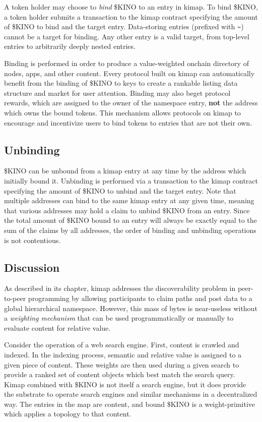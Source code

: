 \documentclass[runningheads]{llncs}
\begin{document}
A token holder may choose to \textit{bind} \$KINO to an entry in kimap.
To bind \$KINO, a token holder submits a transaction to the kimap contract specifying the amount of \$KINO to bind and the target entry.
Data-storing entries (prefixed with \verb|~|) cannot be a target for binding.
Any other entry is a valid target, from top-level entries to arbitrarily deeply nested entries.

Binding is performed in order to produce a value-weighted onchain directory of nodes, apps, and other content.
Every protocol built on kimap can automatically benefit from the binding of \$KINO to keys to create a rankable listing data structure and market for user attention.
Binding may also beget protocol rewards, which are assigned to the owner of the namespace entry, \textbf{not} the address which owns the bound tokens.
This mechanism allows protocols on kimap to encourage and incentivize users to bind tokens to entries that are not their own.

\subsection{Unbinding}

\$KINO can be unbound from a kimap entry at any time by the address which initially bound it.
Unbinding is performed via a transaction to the kimap contract specifying the amount of \$KINO to unbind and the target entry.
Note that multiple addresses can bind to the same kimap entry at any given time, meaning that various addresses may hold a claim to unbind \$KINO from an entry. Since the total amount of \$KINO bound to an entry will always be exactly equal to the sum of the claims by all addresses, the order of binding and unbinding operations is not contentious.

\subsection{Discussion}

As described in its chapter, kimap addresses the discoverability problem in peer-to-peer programming by allowing participants to claim paths and post data to a global hierarchical namespace.
However, this mass of bytes is near-useless without a \textit{weighting mechanism} that can be used programmatically or manually to evaluate content for relative value.

Consider the operation of a web search engine.
First, content is crawled and indexed.
In the indexing process, semantic and relative value is assigned to a given piece of content.
These weights are then used during a given search to provide a ranked set of content objects which best match the search query.
Kimap combined with \$KINO is not itself a search engine, but it does provide the substrate to operate search engines and similar mechanisms in a decentralized way.
The entries in the map are content, and bound \$KINO is a weight-primitive which applies a topology to that content.
\end{document}
